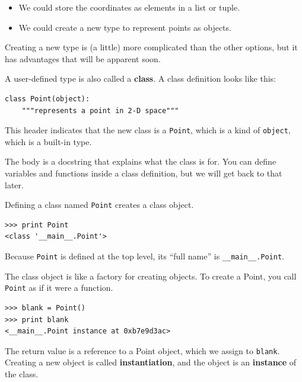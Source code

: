 \documentclass[10pt]{book}
\begin{document}
{\begin{itemize}
\item We could store the coordinates as elements in a list
or tuple.

\item We could create a new type to represent points as
objects.

\end{itemize}


Creating a new type
is (a little) more complicated than the other options, but
it has advantages that will be apparent soon.

A user-defined type is also called a {\bf class}.
A class definition looks like this:


\beforeverb
\begin{verbatim}
class Point(object):
    """represents a point in 2-D space"""
\end{verbatim}
\afterverb
%
This header indicates that the new class is a {\tt Point},
which is a kind of {\tt object}, which is a built-in
type.


The body is a docstring that explains what the class is for.
You can define variables and functions inside a class definition,
but we will get back to that later.


Defining a class named {\tt Point} creates a class object.

\beforeverb
\begin{verbatim}
>>> print Point
<class '__main__.Point'>
\end{verbatim}
\afterverb
%
Because {\tt Point} is defined at the top level, its ``full
name'' is \verb"__main__.Point".


The class object is like a factory for creating objects.  To create a
Point, you call {\tt Point} as if it were a function.

\beforeverb
\begin{verbatim}
>>> blank = Point()
>>> print blank
<__main__.Point instance at 0xb7e9d3ac>
\end{verbatim}
\afterverb
%
The return value is a reference to a Point object, which we
assign to {\tt blank}.  
Creating a new object is called
{\bf instantiation}, and the object is an {\bf instance} of
the class.

}
\end{document}
